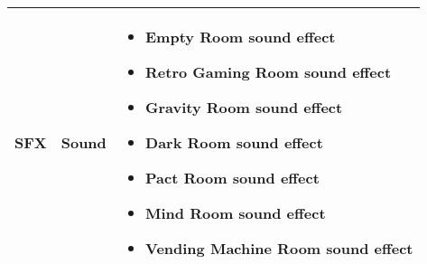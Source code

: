 \begin{tabular}{|m{3cm}|m{3cm}|m{7cm}|}
	\hline
	\textbf{SFX}& Sound & 
	\begin{itemize}
		\item Empty Room sound effect
		\item Retro Gaming Room sound effect
		\item Gravity Room sound effect
		\item Dark Room sound effect
		\item Pact Room sound effect
		\item Mind Room sound effect
		\item Vending Machine Room sound effect
     \end{itemize}\\
     \hline
\end{tabular}	

\pagebreak